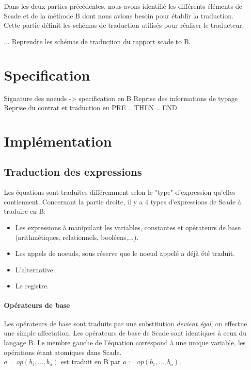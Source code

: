 


Dans les deux parties précédentes, nous avons identifié les différents
éléments de Scade et de la méthode B dont nous avions besoin pour
établir la traduction. Cette partie définit les schémas de traduction
utilisés pour réaliser le traducteur.


...
Reprendre les schémas de traduction du rapport scade to B.

\section{Specification}

Signature des noeuds -> specification en B
Reprise des informations de typage
Reprise du contrat et traduction en PRE .. THEN .. END








\section{Implémentation}

\subsection{Traduction des expressions}

Les équations sont traduites différemment selon le "type" d'expression qu'elles
contiennent.  
Concernant la partie droite, il y a 4 types d'expressions de Scade à traduire en B:
\begin{itemize}
\item Les expressions à manipulant les variables, constantes et opérateurs de
  base (arithmétiques, relationnels, booléens,...).
\item Les appels de noeuds, sous réserve que le noeud appelé a déjà été
  traduit. 
\item L'alternative.
\item Le registre.
\end{itemize}

\paragraph{Opérateurs de base}
Les opérateurs de base sont traduits par une substitution \emph{devient égal}, on
effectue une simple affectation. Les opérateurs de base de Scade sont identiques
à ceux du langage B. Le membre gauche de l'équation correspond à une unique
variable, les opérations étant atomiques dans Scade. \\
$a = op(b_1,...,b_n)$ est traduit en B par $a:=op(b_1,...,b_n)$. 

